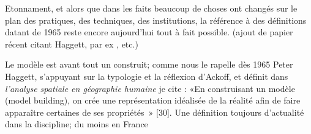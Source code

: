 Etonnament, et alors que dans les faits beaucoup de choses ont changés sur le plan des pratiques, des techniques, des institutions, la référence à des définitions datant de 1965 reste encore aujourd'hui tout à fait possible. (ajout de papier récent citant Haggett, par ex \autocite{Antony2013}, \autocite{Dastes2001} etc.)

Le modèle est avant tout un construit; comme nous le rapelle dès 1965 Peter Haggett, s'appuyant sur la typologie et la réflexion d'Ackoff, et définit dans \textit{l'analyse spatiale en géographie humaine} je cite : «En construisant un modèle (model building), on crée une représentation idéalisée de la réalité afin de faire apparaître certaines de ses propriétés » [30]\autocite{Haggett1965}. Une définition toujours d'actualité dans la discipline; du moins en France \autocite{Brunet2000} \autocite[295]{Bailly1995} \autocite{Dastes2001}

